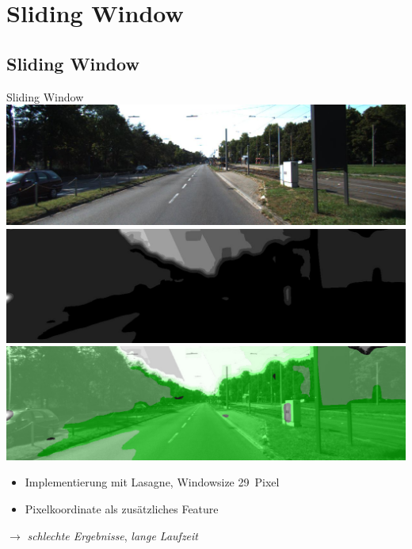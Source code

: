 \section{Sliding Window}

\subsection{Sliding Window}

\begin{frame}{Sliding Window}
  \includegraphics[scale=0.11]{../images/Lasagne/padded.jpg}
  \hspace{0.1cm}
      \includegraphics[scale=0.12]{../images/Lasagne/29x29-color-coordinates.jpg}
         \vspace{0.1cm}
    \includegraphics[scale=0.2]{../images/Lasagne/29x29-color-coordinates-overlay.jpg}
         \begin{itemize}
       \item Implementierung mit Lasagne, Windowsize 29~Pixel
        \item Pixelkoordinate als zusätzliches Feature
    \end{itemize}
  $\rightarrow$ \emph{schlechte Ergebnisse}, \emph{lange Laufzeit}

\end{frame}

